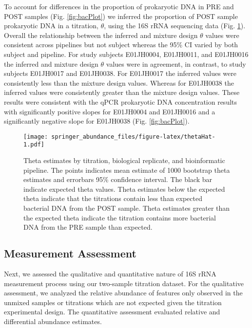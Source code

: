 \documentclass[smallextended]{svjour3}       %
\begin{document}
To account for differences in the proportion of prokaryotic DNA in PRE
and POST samples (Fig. \ref{fig:bacPlot}) we inferred the proportion of
POST sample prokaryotic DNA in a titration, \(\theta\), using the 16S
rRNA sequencing data (Fig. \ref{fig:thetaHat}). Overall the relationship
between the inferred and mixture design \(\theta\) values were
consistent across pipelines but not subject whereas the 95\% CI varied
by both subject and pipeline. For study subjects E01JH0004, E01JH0011,
and E01JH0016 the inferred and mixture design \(\theta\) values were in
agreement, in contrast, to study subjects E01JH0017 and E01JH0038. For
E01JH0017 the inferred values were consistently less than the mixture
design values. Whereas for E01JH0038 the inferred values were
consistently greater than the mixture design values. These results were
consistent with the qPCR prokaryotic DNA concentration results with
significantly positive slopes for E01JH0004 and E01JH0016 and a
significantly negative slope for E01JH0038 (Fig. \ref{fig:bacPlot}).

\begin{figure}
\centering
\texttt{[image: springer\_abundance\_files/figure-latex/thetaHat-1.pdf]}
\caption{\label{fig:thetaHat}Theta estimates by titration, biological
replicate, and bioinformatic pipeline. The points indicates mean
estimate of 1000 bootstrap theta estimates and errorbars 95\% confidence
interval. The black bar indicate expected theta values. Theta estimates
below the expected theta indicate that the titrations contain less than
expected bacterial DNA from the POST sample. Theta estimates greater
than the expected theta indicate the titration contains more bacterial
DNA from the PRE sample than expected.}
\end{figure}

\hypertarget{measurement-assessment}{%
\subsection{Measurement Assessment}\label{measurement-assessment}}

Next, we assessed the qualitative and quantitative nature of 16S rRNA
measurement process using our two-sample titration dataset. For the
qualitative assessment, we analyzed the relative abundance of features
only observed in the unmixed samples or titrations which are not
expected given the titration experimental design. The quantitative
assessment evaluated relative and differential abundance estimates.
\end{document}
